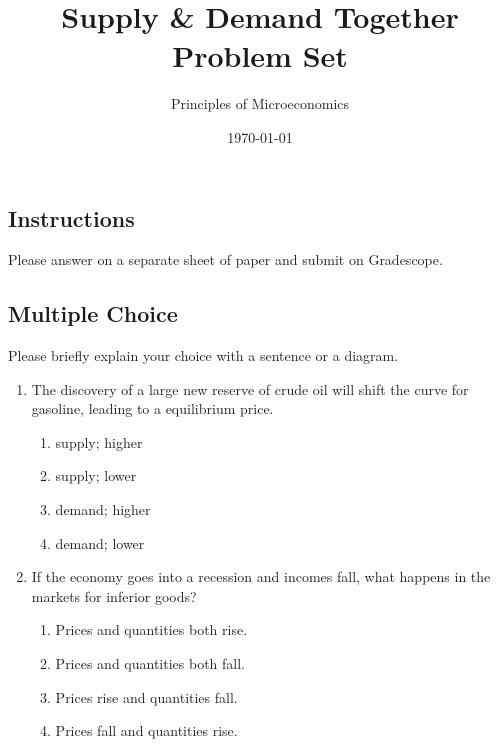 \documentclass{article}
\title{Supply \& Demand Together Problem Set}
\author{Principles of Microeconomics}
\date{\today}
\begin{document}
\maketitle

\subsection*{Instructions} Please answer on a separate sheet of paper and submit on Gradescope. 

\subsection*{Multiple Choice} Please briefly explain your choice with a sentence or a diagram.

\begin{enumerate}

\item The discovery of a large new reserve of crude oil will shift the \underline{\phantom{xxxxxxxxxx}} curve for gasoline, leading to a \underline{\phantom{xxxxxxxxxx}} equilibrium price.

	\begin{enumerate}
	
	\item supply; higher
	
	\item supply; lower
	
	\item demand; higher
	
	\item demand; lower
	
	\end{enumerate}
	
\item If the economy goes into a recession and incomes fall, what happens in the markets for inferior goods?

	\begin{enumerate}
	
	\item Prices and quantities both rise.
	
	\item Prices and quantities both fall.
	
	\item Prices rise and quantities fall.
	
	\item Prices fall and quantities rise.
	
	\end{enumerate}
	

\end{enumerate}
\end{document}
